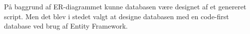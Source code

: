 På baggrund af ER-diagrammet kunne databasen være designet af et genereret script. Men det blev i stedet valgt at designe databasen med en code-first database ved brug af Entity Framework.



%
